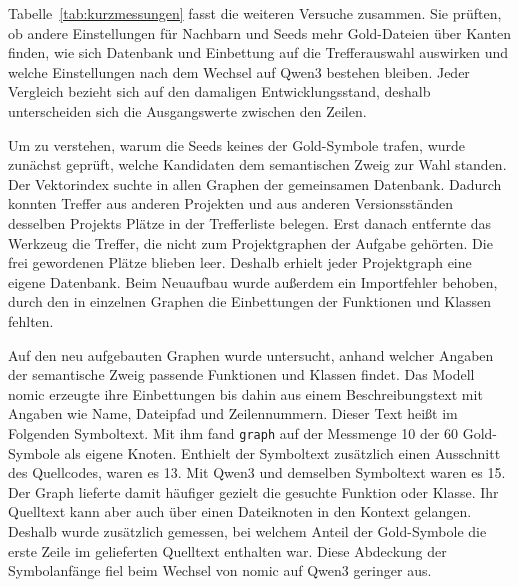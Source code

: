 Tabelle~\ref{tab:kurzmessungen} fasst die weiteren Versuche zusammen. Sie prüften, ob andere Einstellungen für Nachbarn und Seeds mehr Gold-Dateien über Kanten finden, wie sich Datenbank und Einbettung auf die Trefferauswahl auswirken und welche Einstellungen nach dem Wechsel auf Qwen3 bestehen bleiben. Jeder Vergleich bezieht sich auf den damaligen Entwicklungsstand, deshalb unterscheiden sich die Ausgangswerte zwischen den Zeilen.

Um zu verstehen, warum die Seeds keines der Gold-Symbole trafen, wurde zunächst geprüft, welche Kandidaten dem semantischen Zweig zur Wahl standen. Der Vektorindex suchte in allen Graphen der gemeinsamen Datenbank. Dadurch konnten Treffer aus anderen Projekten und aus anderen Versionsständen desselben Projekts Plätze in der Trefferliste belegen. Erst danach entfernte das Werkzeug die Treffer, die nicht zum Projektgraphen der Aufgabe gehörten. Die frei gewordenen Plätze blieben leer. Deshalb erhielt jeder Projektgraph eine eigene Datenbank. Beim Neuaufbau wurde außerdem ein Importfehler behoben, durch den in einzelnen Graphen die Einbettungen der Funktionen und Klassen fehlten.

Auf den neu aufgebauten Graphen wurde untersucht, anhand welcher Angaben der semantische Zweig passende Funktionen und Klassen findet. Das Modell nomic erzeugte ihre Einbettungen bis dahin aus einem Beschreibungstext mit Angaben wie Name, Dateipfad und Zeilennummern. Dieser Text heißt im Folgenden Symboltext. Mit ihm fand \texttt{graph} auf der Messmenge 10 der 60 Gold-Symbole als eigene Knoten. Enthielt der Symboltext zusätzlich einen Ausschnitt des Quellcodes, waren es 13. Mit Qwen3 und demselben Symboltext waren es 15. Der Graph lieferte damit häufiger gezielt die gesuchte Funktion oder Klasse. Ihr Quelltext kann aber auch über einen Dateiknoten in den Kontext gelangen. Deshalb wurde zusätzlich gemessen, bei welchem Anteil der Gold-Symbole die erste Zeile im gelieferten Quelltext enthalten war. Diese Abdeckung der Symbolanfänge fiel beim Wechsel von nomic auf Qwen3 geringer aus.

